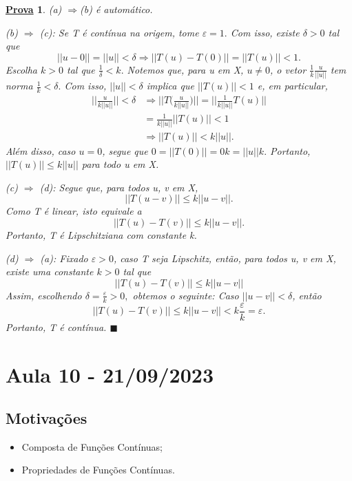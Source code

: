 \documentclass{article}
\newtheorem*{proof*}{\underline{Prova}}
\renewcommand\qedsymbol{$\blacksquare$}
\begin{document}
\begin{proof*}
  (a) \(\Rightarrow \)(b) é automático.

  (b) \(\Rightarrow \) (c): Se T é contínua na origem, tome \(\varepsilon = 1.\) Com isso, existe \(\delta > 0\) tal que 
    \[
      ||u-0|| = ||u|| < \delta \Rightarrow ||T(u)-T(0)|| = ||T(u)|| < 1.
    \]
  Escolha \(k > 0\) tal que \(\frac{1}{\delta } < k.\) Notemos que, para u em X, \(u\neq0\), o vetor
 \(\frac{1}{k}\frac{u}{||u||}\) tem norma \(\frac{1}{k} < \delta .\) Com isso, \(||u|| < \delta \) implica que
 \(||T(u)|| < 1\) e, em particular,
 \begin{align*}
   \biggl|\biggl|\frac{u}{k||u||}\biggr|\biggr| < \delta &\Rightarrow \biggl|\biggl|T \biggl(\frac{u}{k||u||}\biggr)\biggr|\biggr| = \biggl|\biggl|\frac{1}{k||u||}T(u)\biggr|\biggr|\\
                                                         &= \frac{1}{k||u||}||T(u)|| < 1\\
                                                         &\Rightarrow ||T(u)|| < k||u||.
  \end{align*}
  Além disso, caso \(u=0\), segue que \(0 = ||T(0)|| = 0k = ||u||k.\) Portanto, \(||T(u)||\leq k||u||\) para todo u em X.

  (c) \(\Rightarrow \) (d): Segue que, para todos u, v em X, 
    \[
      ||T(u-v)||\leq k||u-v||.
    \]
    Como T é linear, isto equivale a 
    \[
      ||T(u)-T(v)||\leq k||u-v||.
    \]
    Portanto, T é Lipschitziana com constante k.

  (d) \(\Rightarrow \) (a): Fixado \(\varepsilon > 0\), caso T seja Lipschitz, então, para todos u, v em X, existe uma constante \(k > 0\) tal que 
    \[
      ||T(u) - T(v)||\leq  k ||u-v||
    \]
    Assim, escolhendo \(\delta  = \frac{\varepsilon }{k} > 0,\) obtemos o seguinte: Caso \(||u-v|| < \delta \), então 
      \[
        ||T(u)-T(v)||\leq k||u-v|| < k \frac{\varepsilon }{k} = \varepsilon .
      \]
    Portanto, T é contínua. \qedsymbol

\end{proof*}
\newpage

\section{Aula 10 - 21/09/2023}
\subsection{Motivações}
 \begin{itemize}
   \item Composta de Funções Contínuas;
   \item Propriedades de Funções Contínuas.
 \end{itemize}
\end{document}
